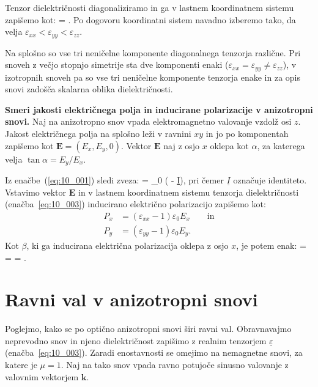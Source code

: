 Tenzor dielektričnosti diagonaliziramo in ga v lastnem koordinatnem 
sistemu zapišemo kot:
\beq
\underline{\varepsilon} = 
\!\!.
\label{eq:10_003}
\eeq
Po dogovoru koordinatni sistem navadno izberemo tako, da velja 
$\varepsilon_{xx}<\varepsilon_{yy}<\varepsilon_{zz}$.

Na splošno so vse tri neničelne komponente diagonalnega tenzorja različne. 
Pri snoveh z večjo stopnjo simetrije sta dve komponenti enaki ($\varepsilon_{xx} = 
\varepsilon_{yy} \neq \varepsilon_{zz}$), v izotropnih snoveh pa so vse tri 
neničelne komponente tenzorja enake in za opis snovi zadošča skalarna oblika dielektričnosti.

\begin{example}{\bf Smeri jakosti električnega polja 
in inducirane polarizacije v anizotropni snovi.}
Naj na anizotropno snov vpada elektromagnetno valovanje vzdolž osi $z$. Jakost
elek\-trič\-ne\-ga polja na splošno leži v ravnini $xy$ in jo po komponentah
zapišemo kot $\mathbf{E} = (E_x, E_y, 0)$. Vektor $\mathbf{E}$ naj z osjo $x$
oklepa kot $\alpha$, za katerega velja $\tan \alpha  = E_y/E_x$.

Iz enačbe~(\ref{eq:10_001}) sledi zveza:
\beq
{} = \varepsilon_0 \left(\underline{\varepsilon} - \underline{I}\right),
\label{eq:10_004}
\eeq
pri čemer $\underline{I}$ označuje identiteto.
Vstavimo vektor $\mathbf{E}$ in v lastnem koordinatnem sistemu tenzorja 
dielektričnosti (enačba~\ref{eq:10_003}) inducirano električno polarizacijo zapišemo kot:
\begin{align}
P_x &= (\varepsilon_{xx}-1) \varepsilon_0 E_x \qquad \mathrm{in} \label{eq:10_005}\\
P_y &= (\varepsilon_{yy}-1) \varepsilon_0 E_y.
\label{eq:10_006}
\end{align}
Kot $\beta$, ki ga inducirana električna polarizacija oklepa z osjo $x$, je potem enak:
\beq
\tan \beta =  = 
 = \tan \alpha.
\eeq
\end{example}

\section{Ravni val v anizotropni snovi}
Poglejmo, kako se po optično anizotropni snovi širi ravni val. 
Obravnavajmo neprevodno snov in njeno dielektričnost 
zapišimo z realnim tenzorjem $\underline{\varepsilon}$ (enačba~\ref{eq:10_003}). 
Zaradi enostavnosti se omejimo na nemagnetne snovi, za katere je $\mu = 1$. 
Naj na tako snov vpada ravno potujoče sinusno valovanje z 
valovnim vektorjem $\mathbf{k}$.  

